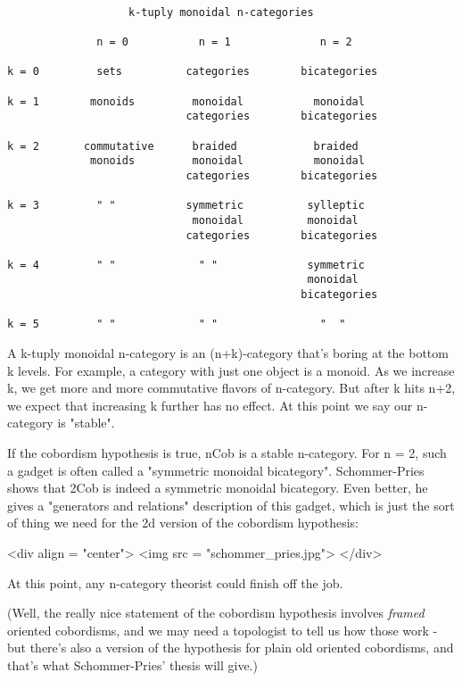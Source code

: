 \begin{verbatim}

                   k-tuply monoidal n-categories 

              n = 0           n = 1              n = 2

k = 0         sets          categories        bicategories

k = 1        monoids         monoidal           monoidal
                            categories        bicategories

k = 2       commutative      braided            braided
             monoids         monoidal           monoidal
                            categories        bicategories 

k = 3         " "           symmetric          sylleptic
                             monoidal          monoidal 
                            categories        bicategories

k = 4         " "             " "              symmetric
                                               monoidal
                                              bicategories

k = 5         " "             " "                "  "
\end{verbatim}
    

A k-tuply monoidal n-category is an (n+k)-category that's boring
at the bottom k levels.  For example, a category with just one
object is a monoid.  As we increase k, we get more and more 
commutative flavors of n-category.  But after k hits n+2, we
expect that increasing k further has no effect.  At this point we 
say our n-category is "stable".

If the cobordism hypothesis is true, nCob is a stable n-category.  
For n = 2, such a gadget is often called a "symmetric monoidal 
bicategory".  Schommer-Pries shows that 2Cob is indeed a symmetric
monoidal bicategory.  Even better, he gives a "generators and 
relations" description of this gadget, which is just the sort of thing 
we need for the 2d version of the cobordism hypothesis:

<div align = "center">
<img src = "schommer_pries.jpg">
</div>

At this point, any n-category theorist could finish off the job.  

(Well, the really nice statement of the cobordism hypothesis involves
\emph{framed} oriented cobordisms, and we may need a topologist to tell us
how those work - but there's also a version of the hypothesis for plain 
old oriented cobordisms, and that's what Schommer-Pries' thesis will
give.)

